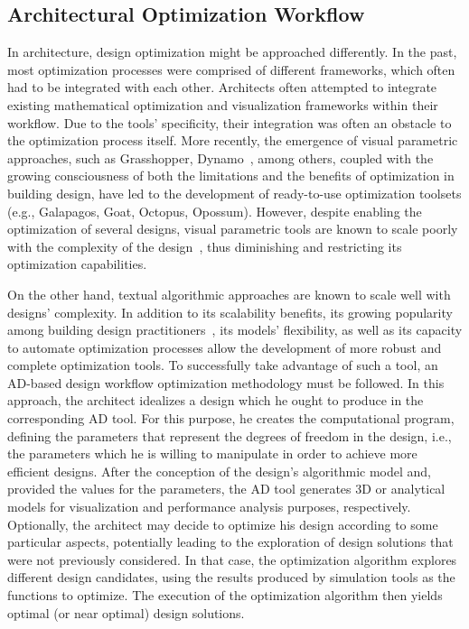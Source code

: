 \subsection{Architectural Optimization Workflow}
	
	In architecture, design optimization might be approached differently. In the past, most optimization processes were comprised of different frameworks, which often had to be integrated with each other. Architects often attempted to integrate existing mathematical optimization and visualization frameworks within their workflow. Due to the tools' specificity, their integration was often an obstacle to the optimization process itself. More recently, the emergence of visual parametric approaches, such as Grasshopper, Dynamo~\cite{GRASSHOPPER,DYNAMOBIM}, among others, coupled with the growing consciousness of both the limitations and the benefits of optimization in building design, have led to the development of ready-to-use optimization toolsets (e.g., Galapagos, Goat, Octopus, Opossum). However, despite enabling the optimization of several designs, visual parametric tools are known to scale poorly with the complexity of the design~\cite{Heijden2015}, thus diminishing and restricting its optimization capabilities. 
	
	On the other hand, textual algorithmic approaches are known to scale well with designs' complexity. In addition to its scalability benefits, its growing popularity among building design practitioners~\cite{Kestelier2013}, its models' flexibility, as well as its capacity to automate optimization processes allow the development of more robust and complete optimization tools. To successfully take advantage of such a tool, an \ac{AD}-based design workflow optimization methodology must be followed. In this approach, the architect idealizes a design which he ought to produce in the corresponding \ac{AD} tool. For this purpose, he creates the computational program, defining the parameters that represent the degrees of freedom in the design, i.e., the parameters which he is willing to manipulate in order to achieve more efficient designs. After the conception of the design's algorithmic model and, provided the values for the parameters, the \ac{AD} tool generates 3D or analytical models for visualization and performance analysis purposes, respectively. Optionally, the architect may decide to optimize his design according to some particular aspects, potentially leading to the exploration of design solutions that were not previously considered. In that case, the optimization algorithm explores different design candidates, using the results produced by simulation tools as the functions to optimize. The execution of the optimization algorithm then yields optimal (or near optimal) design solutions.
	
